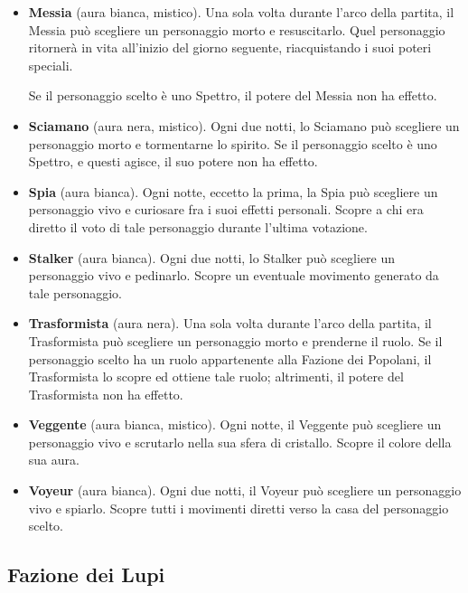 \documentclass[a4paper,10pt]{article}
\begin{document}
\begin{itemize}
	\item {\bf Messia} (aura bianca, mistico). Una sola volta durante l'arco della partita, il Messia può scegliere un personaggio morto e resuscitarlo. Quel personaggio ritornerà in vita all'inizio del giorno seguente, riacquistando i suoi poteri speciali.
 
	 Se il personaggio scelto è uno Spettro, il potere del Messia non ha effetto.

	\item{\bf Sciamano} (aura nera, mistico). Ogni due notti, lo Sciamano può scegliere un personaggio morto e tormentarne lo spirito. Se il personaggio scelto è uno Spettro, e questi agisce, il suo potere non ha effetto.
	
	\item {\bf Spia} (aura bianca). Ogni notte, eccetto la prima, la Spia può scegliere un personaggio vivo e curiosare fra i suoi effetti personali. Scopre a chi era diretto il voto di tale personaggio durante l'ultima votazione.

	\item {\bf Stalker} (aura bianca). Ogni due notti, lo Stalker può scegliere un personaggio vivo e pedinarlo. Scopre un eventuale movimento generato da tale personaggio.
	
	\item {\bf Trasformista} (aura nera). Una sola volta durante l'arco della partita, il Trasformista può scegliere un personaggio morto e prenderne il ruolo. Se il personaggio scelto ha un ruolo appartenente alla Fazione dei Popolani, il Trasformista lo scopre ed ottiene tale ruolo; altrimenti, il potere del Trasformista non ha effetto.
	
	\item {\bf Veggente} (aura bianca, mistico). Ogni notte, il Veggente può scegliere un personaggio vivo e scrutarlo nella sua sfera di cristallo. Scopre il colore della sua aura.

	\item {\bf Voyeur} (aura bianca). Ogni due notti, il Voyeur può scegliere un personaggio vivo e spiarlo. Scopre tutti i movimenti diretti verso la casa del personaggio scelto.
	
\end{itemize}


\subsection*{Fazione dei Lupi}
\end{document}
